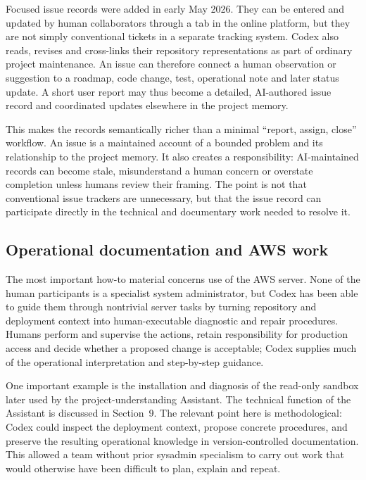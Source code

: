Focused issue records were added in early May 2026. They can be entered and
updated by human collaborators through a tab in the online platform, but they
are not simply conventional tickets in a separate tracking system. Codex also
reads, revises and cross-links their repository representations as part of
ordinary project maintenance. An issue can therefore connect a human
observation or suggestion to a roadmap, code change, test, operational note
and later status update. A short user report may thus become a detailed,
AI-authored issue record and coordinated updates elsewhere in the project
memory.

This makes the records semantically richer than a minimal ``report, assign,
close'' workflow. An issue is a maintained account of a bounded problem and
its relationship to the project memory. It also creates a responsibility:
AI-maintained records can become stale, misunderstand a human concern or
overstate completion unless humans review their framing. The point is not that
conventional issue trackers are unnecessary, but that the issue record can
participate directly in the technical and documentary work needed to resolve
it.

\subsection{Operational documentation and AWS work}

The most important how-to material concerns use of the AWS server. None of the
human participants is a specialist system administrator, but Codex has been
able to guide them through nontrivial server tasks by turning repository and
deployment context into human-executable diagnostic and repair procedures.
Humans perform and supervise the actions, retain responsibility for production
access and decide whether a proposed change is acceptable; Codex supplies much
of the operational interpretation and step-by-step guidance.

One important example is the installation and diagnosis of the read-only
sandbox later used by the project-understanding Assistant. The technical
function of the Assistant is discussed in Section~9. The relevant point here
is methodological: Codex could inspect the deployment context, propose
concrete procedures, and preserve the resulting operational knowledge in
version-controlled documentation. This allowed a team without prior sysadmin
specialism to carry out work that would otherwise have been difficult to
plan, explain and repeat.

